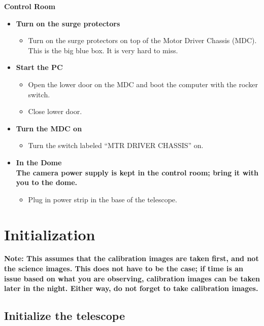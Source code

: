\documentclass[letterpaper, 12pt]{report}
\begin{document}
{\large\textbf{Control Room}}
\begin{itemize}
	\item \textbf{Turn on the surge protectors}
	\begin{itemize}
		\item Turn on the surge protectors on top of the Motor Driver Chassis (MDC). This is the big blue box. It is very hard to miss.
	\end{itemize}
	\item \textbf{Start the PC}
	\begin{itemize}
		\item Open the lower door on the MDC and boot the computer with the rocker switch.
		\item Close lower door.
	\end{itemize}
	\item \textbf{Turn the MDC on}
	\begin{itemize}
		\item Turn the switch labeled ``MTR DRIVER CHASSIS'' on.
	\end{itemize}
	\item \textbf{In the Dome} \\
	\noindent \textbf{The camera power supply is kept in the control room; bring it with you to the dome.}
	\begin{itemize}
		\item Plug in power strip in the base of the telescope.
	\end{itemize}
\end{itemize}

\newpage



\chapter{Initialization}\label{ch:initialization}
\textbf{Note: This assumes that the calibration images are taken first, and not the science images. This does not have to be the case; if time is an issue based on what you are observing, calibration images can be taken later in the night. Either way, do not forget to take calibration images.} \\

\section{Initialize the telescope}
\end{document}
